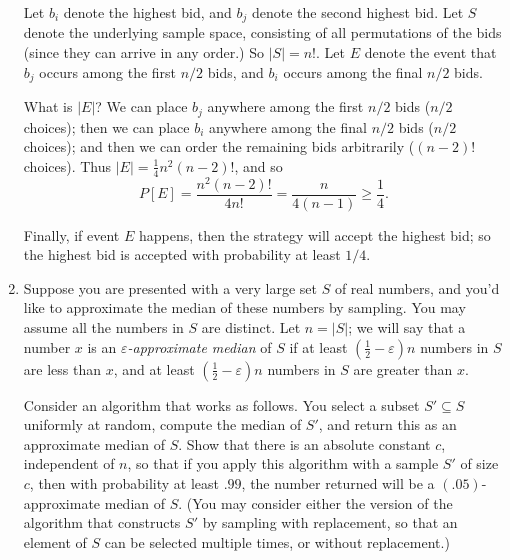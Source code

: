 \documentclass[12pt]{article}
\def\ve{{\varepsilon}}
\begin{document}
\begin{enumerate}
{Let $b_i$ denote the highest bid, and $b_j$ denote
the second highest bid.
Let $S$ denote the underlying sample space,
consisting of all permutations of the bids
(since they can arrive in any order.)
So $|S| = n!$.
Let $E$ denote the event that $b_j$ occurs among
the first $n/2$ bids, and $b_i$ occurs among
the final $n/2$ bids.

What is $|E|$?
We can place $b_j$ anywhere among the first $n/2$ bids
($n/2$ choices);
then we can place $b_i$ anywhere among the final $n/2$ bids
($n/2$ choices);
and then we can order the remaining bids arbitrarily
($(n-2)!$ choices).
Thus $|E| = \frac14 n^2 (n-2)!$, and so
$$P[E] = \frac{n^2 (n-2)!}{4 n!} = \frac{n}{4(n-1)} \geq \frac14.$$

Finally, if event $E$ happens, then the strategy will
accept the highest bid; so the highest bid is accepted
with probability at least $1/4$.

}



\item

Suppose you are presented with a very large set $S$ of real numbers,
and you'd like to approximate the median of these numbers by sampling.
You may assume all the numbers in $S$ are distinct.
Let $n = |S|$; we will say that a number $x$ is an
{\em $\ve$-approximate median} of $S$ if at least
$(\frac12 - \ve) n$ numbers in $S$ are less than $x$,
and at least $(\frac12 - \ve) n$ numbers in $S$ are
greater than $x$.

Consider an algorithm that works as follows.
You select a subset $S' \subseteq S$ uniformly at random,
compute the median of $S'$, and return this as an
approximate median of $S$.
Show that there is an absolute constant $c$, independent of $n$,
so that if you apply this algorithm with a sample $S'$ of size $c$,
then with probability at least $.99$,
the number returned will be a $(.05)$-approximate median of $S$.
(You may consider either the version of the algorithm
that constructs $S'$ by sampling with replacement, so that
an element of $S$ can be selected multiple times,
or without replacement.)



\end{enumerate}
\end{document}
